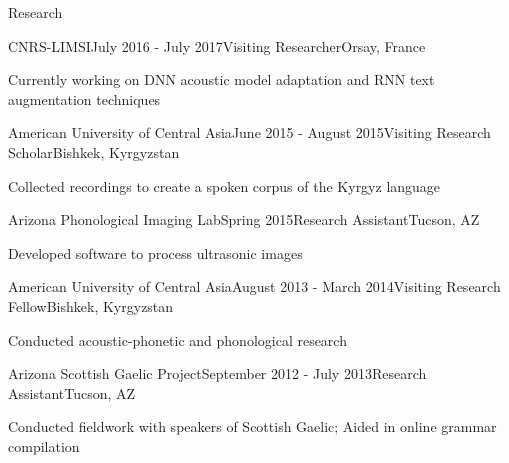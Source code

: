 \documentclass{resume} %
\begin{document}


\vspace{.25cm}

\begin{rSection}{Research}

\begin{rSubsection}{CNRS-LIMSI}{July 2016 - July 2017}{Visiting Researcher}{Orsay, France}
\item Currently working on DNN acoustic model adaptation and RNN text augmentation techniques
\end{rSubsection}

\begin{rSubsection}{American University of Central Asia}{June 2015 - August 2015}{Visiting Research Scholar}{Bishkek, Kyrgyzstan}
\item Collected recordings to create a spoken corpus of the Kyrgyz language
\end{rSubsection}

\begin{rSubsection}{Arizona Phonological Imaging Lab}{Spring 2015}{Research Assistant}{Tucson, AZ}
\item Developed software to process ultrasonic images
\end{rSubsection}

\begin{rSubsection}{American University of Central Asia}{August 2013 - March 2014}{Visiting Research Fellow}{Bishkek, Kyrgyzstan}
\item Conducted acoustic-phonetic and phonological research
\end{rSubsection}

\begin{rSubsection}{Arizona Scottish Gaelic Project}{September 2012 - July 2013}{Research Assistant}{Tucson, AZ}
\item Conducted fieldwork with speakers of Scottish Gaelic; Aided in online grammar compilation
\end{rSubsection}


\end{rSection}
\end{document}
